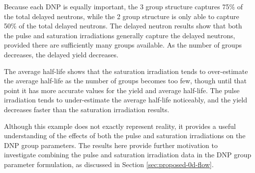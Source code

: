 Because each \gls{DNP} is equally important, the 3 group structure captures 75\% of the total delayed neutrons, while the 2 group structure is only able to capture 50\% of the total delayed neutrons.
The delayed neutron results show that both the pulse and saturation irradiations generally capture the delayed neutrons, provided there are sufficiently many groups available.
As the number of groups decreases, the delayed yield decreases.

The average half-life shows that the saturation irradiation tends to over-estimate the average half-life as the number of groups becomes too few, though until that point it has more accurate values for the yield and average half-life.
The pulse irradiation tends to under-estimate the average half-life noticeably, and the yield decreases faster than the saturation irradiation results.

Although this example does not exactly represent reality, it provides a useful understanding of the effects of both the pulse and saturation irradiations on the \gls{DNP} group parameters.
The results here provide further motivation to investigate combining the pulse and saturation irradiation data in the \gls{DNP} group parameter formulation, as discussed in Section \ref{sec:proposed-0d-flow}.